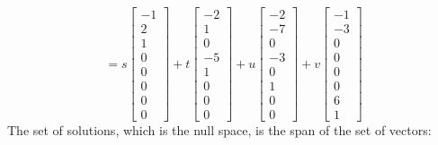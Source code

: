\documentclass{article}
\begin{document}
\begin{itemize}
\[= s\begin{bmatrix} -1 \\ 2 \\ 1 \\ 0 \\ 0 \\ 0 \\ 0 \\ 0 \end{bmatrix} + t\begin{bmatrix} -2 \\ 1 \\ 0 \\ -5 \\ 1 \\ 0 \\ 0 \\ 0 \end{bmatrix} + u\begin{bmatrix} -2 \\ -7 \\ 0 \\ -3 \\ 0 \\ 1 \\ 0 \\ 0 \end{bmatrix} + v\begin{bmatrix} -1 \\ -3 \\ 0 \\ 0 \\ 0 \\ 0 \\ 6 \\ 1 \end{bmatrix}\]
The set of solutions, which is the null space, is the span of the set of vectors:

\end{itemize}
\end{document}
